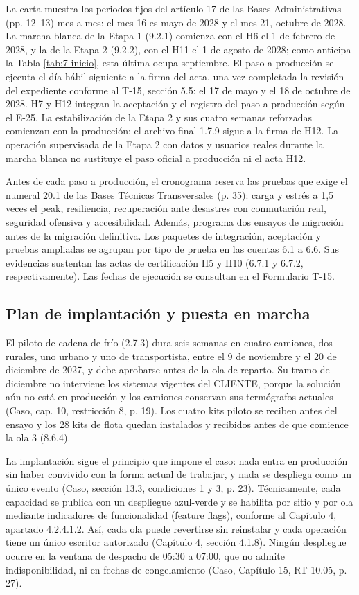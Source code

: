 La carta muestra los periodos fijos del artículo 17 de las Bases Administrativas (pp. 12--13) mes a mes: el mes 16 es mayo de 2028 y el mes 21, octubre de 2028. La marcha blanca de la Etapa 1 (9.2.1) comienza con el H6 el 1 de febrero de 2028, y la de la Etapa 2 (9.2.2), con el H11 el 1 de agosto de 2028; como anticipa la Tabla \ref{tab:7-inicio}, esta última ocupa septiembre. El paso a producción se ejecuta el día hábil siguiente a la firma del acta, una vez completada la revisión del expediente conforme al T-15, sección 5.5: el 17 de mayo y el 18 de octubre de 2028. H7 y H12 integran la aceptación y el registro del paso a producción según el E-25. La estabilización de la Etapa 2 y sus cuatro semanas reforzadas comienzan con la producción; el archivo final 1.7.9 sigue a la firma de H12. La operación supervisada de la Etapa 2 con datos y usuarios reales durante la marcha blanca no sustituye el paso oficial a producción ni el acta H12.

Antes de cada paso a producción, el cronograma reserva las pruebas que exige el numeral 20.1 de las Bases Técnicas Transversales (p. 35): carga y estrés a 1,5 veces el peak, resiliencia, recuperación ante desastres con conmutación real, seguridad ofensiva y accesibilidad. Además, programa dos ensayos de migración antes de la migración definitiva. Los paquetes de integración, aceptación y pruebas ampliadas se agrupan por tipo de prueba en las cuentas 6.1 a 6.6. Sus evidencias sustentan las actas de certificación H5 y H10 (6.7.1 y 6.7.2, respectivamente). Las fechas de ejecución se consultan en el Formulario T-15.

\subsection{Plan de implantación y puesta en marcha}

El piloto de cadena de frío (2.7.3) dura seis semanas en cuatro camiones, dos rurales, uno urbano y uno de transportista, entre el 9 de noviembre y el 20 de diciembre de 2027, y debe aprobarse antes de la ola de reparto. Su tramo de diciembre no interviene los sistemas vigentes del CLIENTE, porque la solución aún no está en producción y los camiones conservan sus termógrafos actuales (Caso, cap. 10, restricción 8, p. 19). Los cuatro kits piloto se reciben antes del ensayo y los 28 kits de flota quedan instalados y recibidos antes de que comience la ola 3 (8.6.4).

La implantación sigue el principio que impone el caso: nada entra en producción sin haber convivido con la forma actual de trabajar, y nada se despliega como un único evento (Caso, sección 13.3, condiciones 1 y 3, p. 23). Técnicamente, cada capacidad se publica con un despliegue azul-verde y se habilita por sitio y por ola mediante indicadores de funcionalidad (feature flags), conforme al Capítulo 4, apartado 4.2.4.1.2. Así, cada ola puede revertirse sin reinstalar y cada operación tiene un único escritor autorizado (Capítulo 4, sección 4.1.8). Ningún despliegue ocurre en la ventana de despacho de 05:30 a 07:00, que no admite indisponibilidad, ni en fechas de congelamiento (Caso, Capítulo 15, RT-10.05, p. 27).

